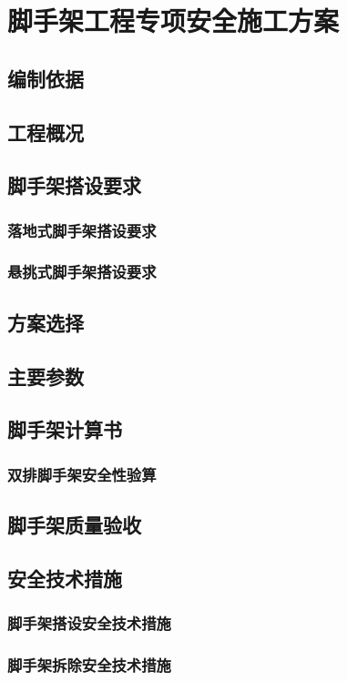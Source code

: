 \section{脚手架工程专项安全施工方案}
\subsection{编制依据}

\subsection{工程概况}

\subsection{脚手架搭设要求}
\subsubsection{落地式脚手架搭设要求}

\subsubsection{悬挑式脚手架搭设要求}

\subsection{方案选择}

\subsection{主要参数}

\subsection{脚手架计算书}
\subsubsection{双排脚手架安全性验算}

\subsection{脚手架质量验收}

\subsection{安全技术措施}
\subsubsection{脚手架搭设安全技术措施}

\subsubsection{脚手架拆除安全技术措施}
